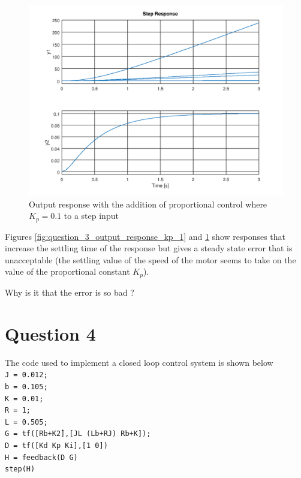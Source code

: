\documentclass[a4paper, 12pt]{article}
\begin{document}
\begin{figure}[H]
	\centering
	\includegraphics[width=\textwidth]{Images/question_3_output_response_kp_01.png}
	\caption{Output response with the addition of proportional control where $K_p = 0.1$ to a step input}
	\label{fig:question_3_output_response_kp_01}
\end{figure}

Figures \ref{fig:question_3_output_response_kp_1} and \ref{fig:question_3_output_response_kp_01} show responses that increase the settling time of the response but gives a steady state error that is unacceptable (the settling value of the speed of the motor seems to take on the value of the proportional constant $K_p$). 

Why is it that the error is so bad ?

\section{Question 4} %
\label{sec:question_4}
The code used to implement a closed loop control system is shown below\\
\noindent
\texttt{J = 0.012;}\\
\texttt{b = 0.105;}\\
\texttt{K = 0.01;}\\
\texttt{R = 1;}\\
\texttt{L = 0.505;}\\
\texttt{G = tf([R\*b+K\^2],[J\*L (L\*b+R\*J) R\*b+K]);}\\
\texttt{D = tf([Kd Kp Ki],[1 0])}\\
\texttt{H = feedback(D \* G)}\\
\texttt{step(H)}\\
\end{document}

